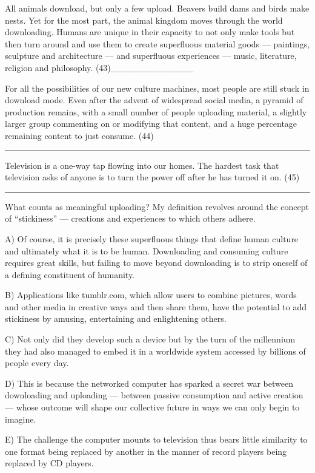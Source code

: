 \documentclass[UTF8,11pt]{ctexart}
\begin{document}
All animals download, but only a few upload. Beavers build dams and birds make nests. Yet for the most part, the animal kingdom moves through the world downloading. Humans are unique in their capacity to not only make tools but then turn around and use them to create superfluous material goods — paintings, sculpture and architecture — and superfluous experiences — music, literature, religion and philosophy. (43)\_\_\_\_\_\_\_\_\_\_\_\_\_


For all the possibilities of our new culture machines, most people are still stuck in download mode. Even after the advent of widespread social media, a pyramid of production remains, with a small number of people uploading material, a slightly larger group commenting on or modifying that content, and a huge percentage remaining content to just consume. (44) \par\noindent\rule{.95\linewidth}{.4pt}\par


Television is a one-way tap flowing into our homes. The hardest task that television asks of anyone is to turn the power off after he has turned it on. (45)\par\noindent\rule{.95\linewidth}{.4pt}\par


What counts as meaningful uploading? My definition revolves around the concept of “stickiness” — creations and experiences to which others adhere.


A) Of course, it is precisely these superfluous things that define human culture and ultimately what it is to be human. Downloading and consuming culture requires great skills, but failing to move beyond downloading is to strip oneself of a defining constituent of humanity.


B) Applications like tumblr.com, which allow users to combine pictures, words and other media in creative ways and then share them, have the potential to add stickiness by amusing, entertaining and enlightening others.


C) Not only did they develop such a device but by the turn of the millennium they had also managed to embed it in a worldwide system accessed by billions of people every day.


D) This is because the networked computer has sparked a secret war between downloading and uploading — between passive consumption and active creation — whose outcome will shape our collective future in ways we can only begin to imagine.


E) The challenge the computer mounts to television thus bears little similarity to one format being replaced by another in the manner of record players being replaced by CD players.
\end{document}
